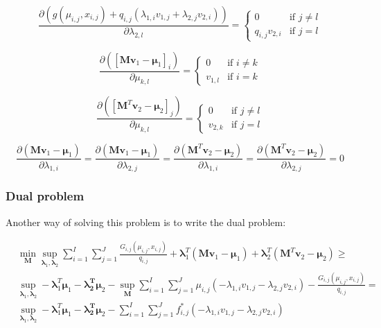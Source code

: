 \documentclass{tex/note}
\begin{document}
\begin{equation*}
\frac{\partial \left( g \left( \mu_{i,j} , x_{i,j} \right) + q_{i,j} \left( \lambda_{1,i} v_{1,j} + \lambda_{2,j} v_{2,i} \right) \right)}{\partial \lambda_{2,l}} =
\begin{cases}
0 & \text{if } j \neq l \\
q_{i,j} v_{2,i} & \text{if } j = l
\end{cases}
\end{equation*}

\begin{equation*}
\frac{\partial \left( \left[ \bm{M} \bm{v}_1 - \bm{\mu}_1 \right]_i \right)}{\partial \mu_{k,l}} =
\begin{cases}
0 & \text{if } i \neq k \\
v_{1,l} & \text{if } i = k
\end{cases}
\end{equation*}

\begin{equation*}
\frac{\partial \left( \left[ \bm{M}^T \bm{v}_2 - \bm{\mu}_2 \right]_j \right)}{\partial \mu_{k,l}} =
\begin{cases}
0 & \text{if } j \neq l \\
v_{2,k} & \text{if } j = l
\end{cases}
\end{equation*}

\begin{equation*}
\frac{\partial \left( \bm{M} \bm{v}_1 - \bm{\mu}_1 \right)}{\partial \lambda_{1,i}} = \frac{\partial \left( \bm{M} \bm{v}_1 - \bm{\mu}_1 \right)}{\partial \lambda_{2,j}} = \frac{\partial \left( \bm{M}^T \bm{v}_2 - \bm{\mu}_2 \right)}{\partial \lambda_{1,i}} = \frac{\partial \left( \bm{M}^T \bm{v}_2 - \bm{\mu}_2 \right)}{\partial \lambda_{2,j}} = 0
\end{equation*}

\subsubsection{Dual problem}

Another way of solving this problem is to write the dual problem:

\begin{align*}
& \min_{\bm{M}} \sup_{\bm{\lambda}_1 , \bm{\lambda}_2} \sum_{i = 1}^I \sum_{j = 1}^J \frac{G_{i,j} \left( \mu_{i,j} , x_{i,j} \right)}{q_{i,j}} + \bm{\lambda}_1^T \left( \bm{M} \bm{v}_1 - \bm{\mu}_1 \right) + \bm{\lambda}_2^T \left( \bm{M}^T \bm{v}_2 - \bm{\mu}_2 \right) \geq \\
& \sup_{\bm{\lambda}_1, \bm{\lambda}_2} - \bm{\lambda}_1^T \bm{\mu}_1 - \bm{\lambda_2^T} \bm{\mu}_2 - \sup_{\bm{M}} \sum_{i = 1}^I \sum_{j = 1}^J \mu_{i,j} \left( - \lambda_{1,i} v_{1,j} - \lambda_{2,j} v_{2,i} \right) - \frac{G_{i,j} \left( \mu_{i,j} , x_{i,j} \right)}{q_{i,j}} = \\
& \sup_{\bm{\lambda}_1, \bm{\lambda}_2} - \bm{\lambda}_1^T \bm{\mu}_1 - \bm{\lambda_2^T} \bm{\mu}_2 - \sum_{i = 1}^I \sum_{j = 1}^J f_{i,j}^* \left( - \lambda_{1,i} v_{1,j} - \lambda_{2,j} v_{2,i} \right)
\end{align*}
\end{document}
